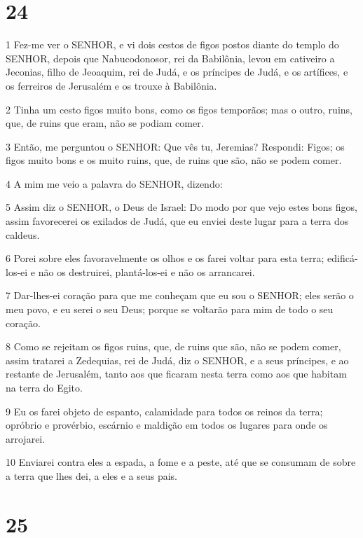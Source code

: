 \chapter{24}

\par 1 Fez-me ver o SENHOR, e vi dois cestos de figos postos diante do templo do SENHOR, depois que Nabucodonosor, rei da Babilônia, levou em cativeiro a Jeconias, filho de Jeoaquim, rei de Judá, e os príncipes de Judá, e os artífices, e os ferreiros de Jerusalém e os trouxe à Babilônia.
\par 2 Tinha um cesto figos muito bons, como os figos temporãos; mas o outro, ruins, que, de ruins que eram, não se podiam comer.
\par 3 Então, me perguntou o SENHOR: Que vês tu, Jeremias? Respondi: Figos; os figos muito bons e os muito ruins, que, de ruins que são, não se podem comer.
\par 4 A mim me veio a palavra do SENHOR, dizendo:
\par 5 Assim diz o SENHOR, o Deus de Israel: Do modo por que vejo estes bons figos, assim favorecerei os exilados de Judá, que eu enviei deste lugar para a terra dos caldeus.
\par 6 Porei sobre eles favoravelmente os olhos e os farei voltar para esta terra; edificá-los-ei e não os destruirei, plantá-los-ei e não os arrancarei.
\par 7 Dar-lhes-ei coração para que me conheçam que eu sou o SENHOR; eles serão o meu povo, e eu serei o seu Deus; porque se voltarão para mim de todo o seu coração.
\par 8 Como se rejeitam os figos ruins, que, de ruins que são, não se podem comer, assim tratarei a Zedequias, rei de Judá, diz o SENHOR, e a seus príncipes, e ao restante de Jerusalém, tanto aos que ficaram nesta terra como aos que habitam na terra do Egito.
\par 9 Eu os farei objeto de espanto, calamidade para todos os reinos da terra; opróbrio e provérbio, escárnio e maldição em todos os lugares para onde os arrojarei.
\par 10 Enviarei contra eles a espada, a fome e a peste, até que se consumam de sobre a terra que lhes dei, a eles e a seus pais.

\chapter{25}

